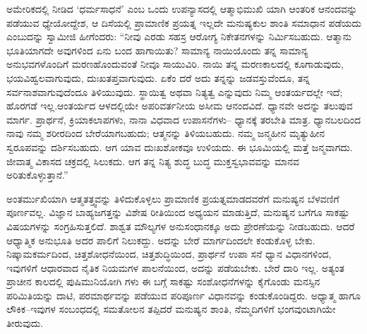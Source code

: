 ಅಮೇರಿಕದಲ್ಲಿ ನೀಡಿದ ‘ಧರ್ಮಸಾಧನೆ’ ಎಂಬ ಒಂದು ಉಪನ್ಯಾಸದಲ್ಲಿ ಆತ್ಮಾಭಿಮುಖಿ ಯಾಗಿ ಆಂತರಿಕ ಆನಂದವನ್ನು ಪಡೆಯುವ ಧ್ಯೇಯೋದ್ದೇಶ, ಆ ದಿಸೆಯಲ್ಲಿ ಪ್ರಾಮಾಣಿಕ ಪ್ರಯತ್ನ ಇಲ್ಲದೇ ಮನುಷ್ಯಕುಲ ಶಾಂತಿ ಸಮಾಧಾನ ಪಡೆಯದು ಎಂಬುದನ್ನು ಸ್ವಾಮೀಜಿ ಹೀಗೆಂದರು: “ನೀವು ಎರಡು ಸಹಸ್ರ ಆರೋಗ್ಯ ನಿಕೇತನಗಳನ್ನು ನಿರ್ಮಿಸಬಹುದು. ಆತ್ಮಾನು ಭೂತಿಯಾಗದೇ ಅವುಗಳಿಂದ ಏನು ಬಂದ ಹಾಗಾಯಿತು? ಸಾಮಾನ್ಯ ನಾಯಿಯೊಂದು ತನ್ನ ಸಾಮಾನ್ಯ ಅನುಭವಗಳೊಂದಿಗೆ ಮರಣಹೊಂದುವಂತೆ ನೀವೂ ಸಾಯುವಿರಿ. ನಾಯಿ ತನ್ನ ಮರಣಕಾಲದಲ್ಲಿ ಕೂಗಾಡುವುದು, ಭಯವಿಹ್ವಲವಾಗುವುದು, ದುಃಖತಪ್ತವಾಗುವುದು. ಏಕೆಂ ದರೆ ಅದು ತನ್ನನ್ನು ಜಡವಸ್ತುವೆಂದೂ, ತನ್ನ ಸರ್ವನಾಶವಾಗುವುದೆಂದೂ ತಿಳಿಯುವುದು. ಸ್ಥಾಯಿತ್ವ ಅಥವಾ ನಿತ್ಯತ್ವ ಎನ್ನುವುದು ನಿಮ್ಮ ಆಂತರ್ಯದಲ್ಲೇ ಇದೆ; ಹೊರಗಡೆ ಇಲ್ಲ.\break ಆಂತರ್ಯದ ಆಳದಲ್ಲಿಯೇ ಅಪರಿವರ್ತನೀಯ ಅಸೀಮ ಆನಂದವಿದೆ. ಧ್ಯಾನವೇ ಅದನ್ನು ತಲುಪುವ ಮಾರ್ಗ. ಪ್ರಾರ್ಥನೆ, ಕ್ರಿಯಾಕಲಾಪಗಳು, ನಾನಾ ವಿಧವಾದ ಉಪಾಸನೆಗಳು– ಧ್ಯಾನಕ್ಕೆ ತರಬೇತಿ ಮಾತ್ರ. ಧ್ಯಾನಬಲದಿಂದ ನಾವು ನಮ್ಮ ಶರೀರದಿಂದ ಬೇರೆಯಾಗಬಹುದು; ಆತ್ಮನನ್ನು ತಿಳಿಯಬಹುದು. ನಮ್ಮ ಜನ್ಮಹೀನ ಮೃತ್ಯುಹೀನ ಸ್ವರೂಪವನ್ನು ದರ್ಶಿಸಬಹುದು. ಆಗ ಯಾವ ದುಃಖಶೋಕವೂ ಉಳಿಯದು. ಈ ಭೂಮಿಯಲ್ಲಿ ಮತ್ತೆ ಜನ್ಮವಾಗದು. ಜೀವಾತ್ಮ ವಿಕಾಸದ ಚಕ್ರದಲ್ಲಿ ಸಿಲುಕದು. ಆಗ ತನ್ನ ನಿತ್ಯ ಶುದ್ಧ ಬುದ್ಧ ಮುಕ್ತಸ್ವಭಾವವನ್ನು ಮಾನವ ಅರಿತುಕೊಳ್ಳುತ್ತಾನೆ.”

ಅಂತರ್ಮುಖಿಯಾಗಿ ಆತ್ಮತತ್ತ್ವವನ್ನು ತಿಳಿದುಕೊಳ್ಳಲು ಪ್ರಾಮಾಣಿಕ ಪ್ರಯತ್ನಮಾಡದ\-ವರೆಗೆ ಮನುಷ್ಯನ ಬೆಳವಣಿಗೆ ಪೂರ್ಣವಲ್ಲ. ವಿಜ್ಞಾನ ಬಾಹ್ಯಜಗತ್ತನ್ನು ವಿಶೇಷ ರೀತಿಯಿಂದ ಅಧ್ಯಯನ ಮಾಡುತ್ತಿದೆ, ಮನುಷ್ಯನ ಬಗೆಗೂ ಸಾಕಷ್ಟು ವಿಷಯಗಳನ್ನು ಸಂಗ್ರಹಿಸುತ್ತಲಿದೆ. ಶಾಶ್ವತ ಮೌಲ್ಯಗಳ ಅನುಸಂಧಾನಕ್ಕೂ ಅದು ಪ್ರೇರಣೆಯನ್ನು ನೀಡಬಹುದು. ಆದರೆ ಆಧ್ಯಾತ್ಮಿಕ ಅನುಭೂತಿ ಅದರ ಪಾಲಿಗೆ ನಿಲುಕದ್ದು. ಅದನ್ನು ಬೇರೆ ಮಾರ್ಗದಿಂದಲೇ ಕಂಡುಕೊಳ್ಳ ಬೇಕು. ನಿಷ್ಕಾಮ\-ಕರ್ಮದಿಂದ, ಚಿತ್ತಶೋಧನೆಯಿಂದ, ಚಿತ್ತಶುದ್ಧಿಯಿಂದ, ಪ್ರಾರ್ಥನೆ ಉಪಾ ಸನೆ ಧ್ಯಾನ ವಿಧಾನಗಳಿಂದ, ಇವುಗಳಿಗೆ ಆಧಾರವಾದ ನೈತಿಕ ನಿಯಮಗಳ ಪಾಲನೆಯಿಂದ, ಅದನ್ನು ಪಡೆಯಬೇಕು. ಬೇರೆ ದಾರಿ ಇಲ್ಲ. ಅತ್ಯಂತ ಪ್ರಾಚೀನ ಕಾಲದಲ್ಲಿ ಪುಷಿಮುನಿಯೋಗಿ ಗಳು ಈ ಬಗ್ಗೆ ಸಾಕಷ್ಟು ಸಂಶೋಧನೆಗಳನ್ನು ಕೈಗೊಂಡು ಮನಸ್ಸಿನ ಪರಿಮಿತಿಯನ್ನು ದಾಟಿ, ಪರಮಾರ್ಥವನ್ನು ಪಡೆಯುವ ಪರಿಪೂರ್ಣ ವಿಧಾನವನ್ನು ಕಂಡುಕೊಂಡಿದ್ದರು. ಅಧ್ಯಾತ್ಮ ಹಾಗೂ ಲೌಕಿಕ–ಇವುಗಳ ಸಂಬಂಧದಲ್ಲಿ ಸಮತೋಲನ ತಪ್ಪಿದರೆ ಮನುಷ್ಯನ ಶಾಂತಿ, ನೆಮ್ಮದಿಗಳಿಗೆ ಭಂಗವುಂಟಾಗಿಯೇ ತೀರುವುದು.

